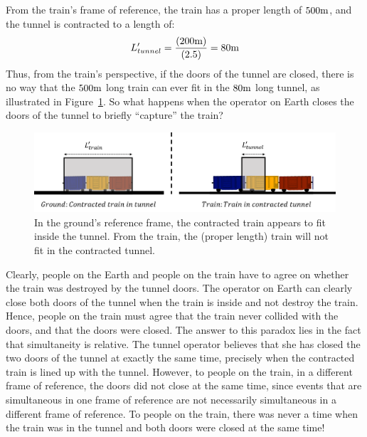 From the train's frame of reference, the train has a proper length of $500 {\rm m}$, and the tunnel is contracted to a length of:
\begin{equation}
L'_{tunnel}=\frac{(200 {\rm m})}{(2.5)}=80 {\rm m}
\end{equation}
Thus, from the train's perspective, if the doors of the tunnel are closed, there is no way that the $500 {\rm m}$ long train can ever fit in the $80 {\rm m}$ long tunnel, as illustrated in Figure~\ref{fig:specialrelativity:barn}. So what happens when the operator on Earth closes the doors of the tunnel to briefly ``capture'' the train?

\begin{figure}[!htbp]
\centering
\includegraphics[width=0.8\linewidth]{files/barn-445f4a4d750354c503a5ac61fc0d77e9.png}
\caption[]{In the ground's reference frame, the contracted train appears to fit inside the tunnel. From the train, the (proper length) train will not fit in the contracted tunnel.}
\label{fig:specialrelativity:barn}
\end{figure}

Clearly, people on the Earth and people on the train have to agree on whether the train was destroyed by the tunnel doors. The operator on Earth can clearly close both doors of the tunnel when the train is inside and not destroy the train. Hence, people on the train must agree that the train never collided with the doors, and that the doors were closed. The answer to this paradox lies in the fact that simultaneity is relative. The tunnel operator believes that she has closed the two doors of the tunnel at exactly the same time, precisely when the contracted train is lined up with the tunnel. However, to people on the train, in a different frame of reference, the doors did not close at the same time, since events that are simultaneous in one frame of reference are not necessarily simultaneous in a different frame of reference. To people on the train, there was never a time when the train was in the tunnel and both doors were closed at the same time!

